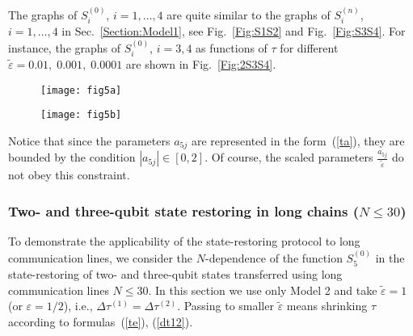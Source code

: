 \documentclass[pra,preprint,showpacs]{revtex4-1}
\begin{document}
{{The graphs of $S^{(0)}_{i}$, $i=1,\dots,4$ are quite similar to the graphs of $S^{(n)}_{i}$, $i=1,\dots,4$ in Sec.~\ref{Section:Model1}, see Fig.~\ref{Fig:S1S2} and Fig.~\ref{Fig:S3S4}. For instance, the graphs of $S^{(0)}_{i}$, $i=3,4$
as functions of  $\tau$ for different  $\tilde \varepsilon =0.01,\; 0.001,\; 0.0001$ are shown in Fig.~\ref{Fig:2S3S4}.
%
\begin{figure*}[!]
\centering
\begin{subfigure}[c]{0.49\textwidth}
\centering
\texttt{[image: fig5a]}
\caption{}
\end{subfigure}
\begin{subfigure}[c]{0.49\textwidth}
\centering
\texttt{[image: fig5b]}
\caption{}
\end{subfigure}
\caption{The $\tau$-dependence of  the characteristics $S^{(0)}_3$ (a) and $S^{(0)}_4$ (b) for different  $\tilde \varepsilon =0.01,\; 0.001,\; 0.0001$. Here $N=6$, $N^{(S)}=N^{(R)}=2$.
}
\label{Fig:2S3S4}
\end{figure*}


Notice that since the parameters  $a_{5j}$ are represented in the form~(\ref{ta}),
they are  bounded by the condition $|a_{5j}|\in [0,2]$. Of course, the scaled parameters $\displaystyle\frac{a_{5j}}{\tilde\varepsilon}$ do not obey this constraint.

\subsubsection{Two- and three-qubit state restoring in long chains ($N\le 30$)}
To demonstrate the applicability of the  state-restoring protocol to long communication lines, we consider the $N$-dependence of the  function $S^{(0)}_5$ in the state-restoring of two- and three-qubit states transferred using long communication lines $N\le 30$.
In this section we use only Model 2 and take $\tilde \varepsilon=1$ (or $\varepsilon=1/2$), i.e., $\Delta\tau^{(1)} =\Delta\tau^{(2)}$. Passing  to smaller $\tilde\varepsilon$ means shrinking $\tau$ according to formulas~(\ref{te}), (\ref{dt12}).

}}
\end{document}
